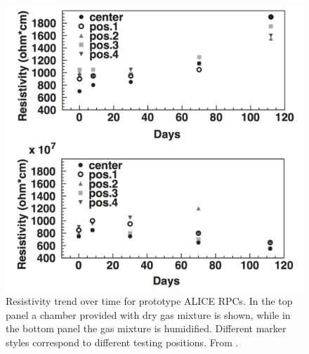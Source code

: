 \begin{figure}[!t]
\begin{center}
\includegraphics[width=0.95\linewidth]{Chapters/Performance/Figs/dry_vs_wet.pdf}
\caption{Resistivity trend over time for prototype ALICE RPCs. In the top panel a chamber provided with dry gas mixture is shown, while in the bottom panel the gas mixture is humidified. Different marker styles correspond to different testing positions. From \cite{aliceRPC:2004}.}
\label{fig:drywet}
\end{center}
\end{figure}




